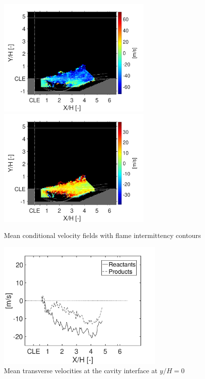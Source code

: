 \begin{figure}
        {\includegraphics[width=3in,trim=0.35in 0 0.42in 0, clip]{figures/B1/cond_statistics/B1_relative_Ux_AVG_conditional}} \hspace{0.4cm}
        {\includegraphics[width=3in,trim=0.35in 0 0.42in 0, clip]{figures/B1/cond_statistics/B1_relative_Uy_AVG_conditional}}
\caption{Mean conditional velocity fields with flame intermittency contours}\label{fig:B2_all_cond_AVG}
\end{figure}

\begin{figure}
\centering
\includegraphics[width=3.25in]{figures/B1/flux/B1_average_YH0_flux} 
\caption{Mean transverse velocities at the cavity interface at $y/H=0$ \label{fig:ch3_cavity_interface_flux}}
\end{figure}
